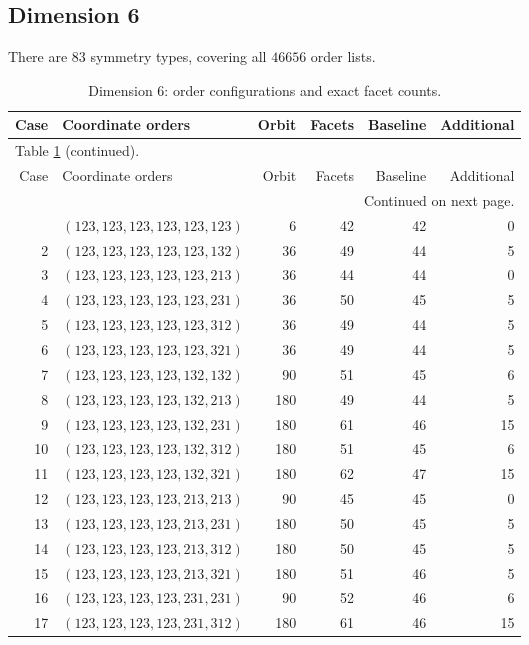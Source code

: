 \documentclass[a4paper,11pt]{amsart}
\numberwithin{equation}{section}
\theoremstyle{definition}
\theoremstyle{remark}
\begin{document}
\clearpage
\subsection{Dimension 6}\label{app:tables-n6}
There are $ 83$ symmetry types, covering all $ 46656$ order lists.
{\small\setlength{\tabcolsep}{4.5pt}
\begin{longtable}{@{}rlrrrr@{}}
\caption{Dimension $ 6$: order configurations and exact facet counts.}\label{tab:counts-n6}\\
\toprule
Case & Coordinate orders & Orbit & Facets & Baseline & Additional\\
\midrule\endfirsthead
\multicolumn{6}{l}{\small Table \ref{tab:counts-n6} (continued).}\\
\toprule
Case & Coordinate orders & Orbit & Facets & Baseline & Additional\\
\midrule\endhead
\midrule
\multicolumn{6}{r}{\small Continued on next page.}\\
\endfoot\bottomrule\endlastfoot
1 & $(123,123,123,123,123,123)$ & 6 & 42 & 42 & 0\\
2 & $(123,123,123,123,123,132)$ & 36 & 49 & 44 & 5\\
3 & $(123,123,123,123,123,213)$ & 36 & 44 & 44 & 0\\
4 & $(123,123,123,123,123,231)$ & 36 & 50 & 45 & 5\\
5 & $(123,123,123,123,123,312)$ & 36 & 49 & 44 & 5\\
6 & $(123,123,123,123,123,321)$ & 36 & 49 & 44 & 5\\
7 & $(123,123,123,123,132,132)$ & 90 & 51 & 45 & 6\\
8 & $(123,123,123,123,132,213)$ & 180 & 49 & 44 & 5\\
9 & $(123,123,123,123,132,231)$ & 180 & 61 & 46 & 15\\
10 & $(123,123,123,123,132,312)$ & 180 & 51 & 45 & 6\\
11 & $(123,123,123,123,132,321)$ & 180 & 62 & 47 & 15\\
12 & $(123,123,123,123,213,213)$ & 90 & 45 & 45 & 0\\
13 & $(123,123,123,123,213,231)$ & 180 & 50 & 45 & 5\\
14 & $(123,123,123,123,213,312)$ & 180 & 50 & 45 & 5\\
15 & $(123,123,123,123,213,321)$ & 180 & 51 & 46 & 5\\
16 & $(123,123,123,123,231,231)$ & 90 & 52 & 46 & 6\\
17 & $(123,123,123,123,231,312)$ & 180 & 61 & 46 & 15\\

\end{longtable}}
\end{document}
